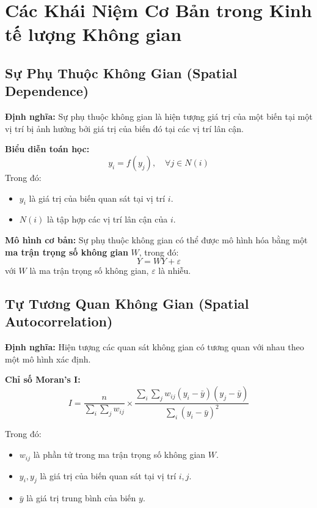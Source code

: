\chapter{Các Khái Niệm Cơ Bản trong Kinh tế lượng Không gian}
\section{Sự Phụ Thuộc Không Gian (Spatial Dependence)}
\textbf{Định nghĩa:} Sự phụ thuộc không gian là hiện tượng giá trị của một biến tại một vị trí bị ảnh hưởng bởi giá trị của biến đó tại các vị trí lân cận.

\textbf{Biểu diễn toán học:}
\begin{equation}
    y_i = f(y_j), \quad \forall j \in N(i)
\end{equation}
Trong đó:
\begin{itemize}
    \item $y_i$ là giá trị của biến quan sát tại vị trí $i$.
    \item $N(i)$ là tập hợp các vị trí lân cận của $i$.
\end{itemize}

\textbf{Mô hình cơ bản:} Sự phụ thuộc không gian có thể được mô hình hóa bằng một \textbf{ma trận trọng số không gian} $W$, trong đó:
\begin{equation}
    Y = W Y + \varepsilon
\end{equation}
với $W$ là ma trận trọng số không gian, $\varepsilon$ là nhiễu.

\section{Tự Tương Quan Không Gian (Spatial Autocorrelation)}
\textbf{Định nghĩa:} Hiện tượng các quan sát không gian có tương quan với nhau theo một mô hình xác định.

\textbf{Chỉ số Moran's I:}
\begin{equation}
    I = \frac{n}{\sum_i \sum_j w_{ij}} \times \frac{\sum_i \sum_j w_{ij} (y_i - \bar{y}) (y_j - \bar{y})}{\sum_i (y_i - \bar{y})^2}
\end{equation}

Trong đó:
\begin{itemize}
    \item $w_{ij}$ là phần tử trong ma trận trọng số không gian $W$.
    \item $y_i, y_j$ là giá trị của biến quan sát tại vị trí $i, j$.
    \item $\bar{y}$ là giá trị trung bình của biến $y$.
\end{itemize}

